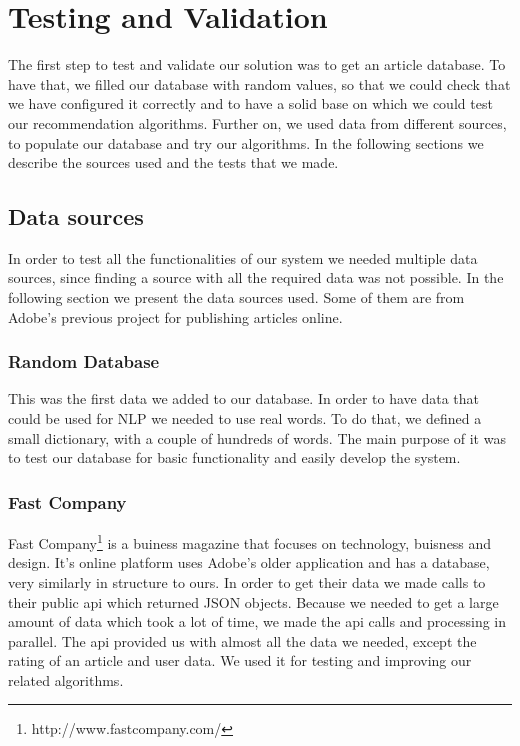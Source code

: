 \chapter{Testing and Validation}
\label{chapter:testing-validation}

The first step to test and validate our solution was to get an article database. To have that, we filled our database with random values, so that we could check that we have configured it correctly and to have a solid base on which we could test our recommendation algorithms.
Further on, we used data from different sources, to populate our database and try our algorithms.
In the following sections we describe the sources used and the tests that we made.

\section{Data sources} 
\label{sec:testing-and-validation-data-sources}
In order to test all the functionalities of our system we needed multiple data sources, since finding a source with all the required data was not possible.
In the following section we present the data sources used. Some of them are from Adobe's previous project for publishing articles online.

\subsection{Random Database} 
\label{sec:testing-and-validation-data-sources-random-database}
This was the first data we added to our database.
In order to have data that could be used for NLP we needed to use real words. To do that, we defined a small dictionary, with a couple of hundreds of words.
The main purpose of it was to test our database for basic functionality and easily develop the system.

\subsection{Fast Company} 
\label{sec:testing-and-validation-data-sources-fast-company}
Fast Company\footnote{http://www.fastcompany.com/} is a buiness magazine that focuses on technology, buisness and design. It's online platform uses Adobe's older application and has a database, very similarly in structure to ours.
In order to get their data we made calls to their public api which returned JSON objects. Because we needed to get a large amount of data which took a lot of time, we made the api calls and processing in parallel. The api provided us with almost all the data we needed, except the rating of an article and user data. We used it for testing and improving our related algorithms.

